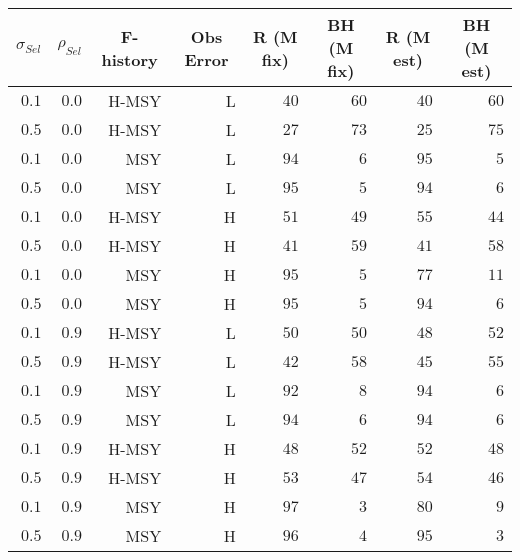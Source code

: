 \begin{center}
\begin{tabular}{rrrrrrrr}
\hline\hline
\multicolumn{1}{c}{$\sigma_{Sel}$}&\multicolumn{1}{c}{$\rho_{Sel}$}&\multicolumn{1}{c}{F-history}&\multicolumn{1}{c}{Obs Error}&\multicolumn{1}{c}{R (M fix)}&\multicolumn{1}{c}{BH (M fix)}&\multicolumn{1}{c}{R (M est)}&\multicolumn{1}{c}{BH (M est)}\tabularnewline
\hline
$0.1$&$0.0$&H-MSY&L&$40$&$60$&$40$&$60$\tabularnewline
$0.5$&$0.0$&H-MSY&L&$27$&$73$&$25$&$75$\tabularnewline
$0.1$&$0.0$&MSY&L&$94$&$ 6$&$95$&$ 5$\tabularnewline
$0.5$&$0.0$&MSY&L&$95$&$ 5$&$94$&$ 6$\tabularnewline
$0.1$&$0.0$&H-MSY&H&$51$&$49$&$55$&$44$\tabularnewline
$0.5$&$0.0$&H-MSY&H&$41$&$59$&$41$&$58$\tabularnewline
$0.1$&$0.0$&MSY&H&$95$&$ 5$&$77$&$11$\tabularnewline
$0.5$&$0.0$&MSY&H&$95$&$ 5$&$94$&$ 6$\tabularnewline
$0.1$&$0.9$&H-MSY&L&$50$&$50$&$48$&$52$\tabularnewline
$0.5$&$0.9$&H-MSY&L&$42$&$58$&$45$&$55$\tabularnewline
$0.1$&$0.9$&MSY&L&$92$&$ 8$&$94$&$ 6$\tabularnewline
$0.5$&$0.9$&MSY&L&$94$&$ 6$&$94$&$ 6$\tabularnewline
$0.1$&$0.9$&H-MSY&H&$48$&$52$&$52$&$48$\tabularnewline
$0.5$&$0.9$&H-MSY&H&$53$&$47$&$54$&$46$\tabularnewline
$0.1$&$0.9$&MSY&H&$97$&$ 3$&$80$&$ 9$\tabularnewline
$0.5$&$0.9$&MSY&H&$96$&$ 4$&$95$&$ 3$\tabularnewline
\hline
\end{tabular}\end{center}
